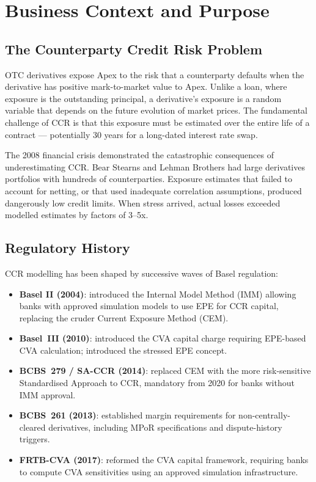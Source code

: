 \documentclass[11pt,a4paper]{article}
\begin{document}
\section{Business Context and Purpose}

\subsection{The Counterparty Credit Risk Problem}

OTC derivatives expose Apex to the risk that a counterparty defaults when the
derivative has positive mark-to-market value to Apex. Unlike a loan, where
exposure is the outstanding principal, a derivative's exposure is a random
variable that depends on the future evolution of market prices. The fundamental
challenge of CCR is that this exposure must be estimated over the entire life
of a contract --- potentially 30 years for a long-dated interest rate swap.

The 2008 financial crisis demonstrated the catastrophic consequences of
underestimating CCR. Bear Stearns and Lehman Brothers had large derivatives
portfolios with hundreds of counterparties. Exposure estimates that failed to
account for netting, or that used inadequate correlation assumptions, produced
dangerously low credit limits. When stress arrived, actual losses exceeded
modelled estimates by factors of 3--5x.

\subsection{Regulatory History}

CCR modelling has been shaped by successive waves of Basel regulation:

\begin{itemize}[noitemsep]
  \item \textbf{Basel II (2004)}: introduced the Internal Model Method (IMM)
        allowing banks with approved simulation models to use EPE for CCR
        capital, replacing the cruder Current Exposure Method (CEM).
  \item \textbf{Basel~III (2010)}: introduced the CVA capital charge requiring
        EPE-based CVA calculation; introduced the stressed EPE concept.
  \item \textbf{BCBS~279 / SA-CCR (2014)}: replaced CEM with the more
        risk-sensitive Standardised Approach to CCR, mandatory from 2020 for
        banks without IMM approval.
  \item \textbf{BCBS~261 (2013)}: established margin requirements for
        non-centrally-cleared derivatives, including MPoR specifications and
        dispute-history triggers.
  \item \textbf{FRTB-CVA (2017)}: reformed the CVA capital framework,
        requiring banks to compute CVA sensitivities using an approved
        simulation infrastructure.
\end{itemize}
\end{document}
